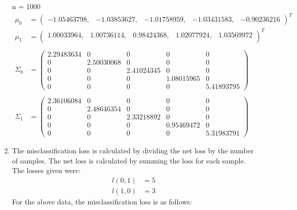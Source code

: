 \documentclass[12pt]{article}
\begin{document}
\begin{enumerate}[leftmargin=*]
    n = 1000
    \begin{align*}
        \mu_0 &= \begin{pmatrix}
            -1.05463798, & -1.03853627, & -1.01758959, & -1.03431583, & -0.90236216
        \end{pmatrix}^T \\
        \mu_1 &= \begin{pmatrix}
            1.00033964, & 1.00736114, & 0.98424368, & 1.02077924, & 1.03569972 \\
        \end{pmatrix}^T \\ \\
        \Sigma_0 &= \begin{pmatrix}
            2.29483634 & 0 & 0 & 0 & 0 \\
            0 & 2.50030068 & 0 & 0 & 0 \\
            0 & 0 & 2.41024345 & 0 & 0 \\
            0 & 0 & 0 & 1.08015965 & 0 \\
            0 & 0 & 0 & 0 & 5.41893795 
        \end{pmatrix} \\ \\
        \Sigma_1 &= \begin{pmatrix}
            2.36106084 & 0 & 0 & 0 & 0 \\
            0 & 2.48646354 & 0 & 0 & 0 \\
            0 & 0 & 2.33218892 & 0 & 0 \\
            0 & 0 & 0 & 0.95469472 & 0 \\
            0 & 0 & 0 & 0 & 5.31983791
        \end{pmatrix}
    \end{align*}

    \vspace*{1cm}
    \item The misclassification loss is calculated by dividing the net loss by the number of samples. The net loss is calculated by summing the loss for each sample. The losses given were:
    \begin{align*}
        l(0,1) &= 5 \\
        l(1,0) &= 3
    \end{align*}
    For the above data, the misclassification loss is as follows:


\end{enumerate}
\end{document}
